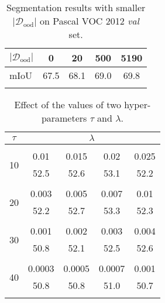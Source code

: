 \documentclass[10pt,twocolumn,letterpaper]{article}
\begin{document}
\newpage
\begin{table}[htbp]
\caption{Segmentation results with smaller $|\mathcal{D}_\text{ood}|$ on Pascal VOC 2012 \textit{val} set.}\label{table_smaller}
\centering
    \begin{tabular}{lcccc}
     \Xhline{1pt}
    { $|\mathcal{D}_\text{ood}|$}  &  0  & 20 & 500 & 5190\\ 
    \hline 
    mIoU & 67.5  &   68.1 & 69.0  & 69.8 \\
    \Xhline{1pt}
    \end{tabular}
\end{table}
\begin{table}[htbp]
  \centering
  \caption{Effect of the values of two hyper-parameters $\tau$ and $\lambda$.}
    \begin{tabular}{ccccc}
    \Xhline{1pt}
    $\tau$   & \multicolumn{4}{c}{$\lambda$} \\
\hline\hline \\[-0.9em]
\multicolumn{1}{c}{\multirow{2}[0]{*}{10}} & 0.01  & 0.015 & 0.02  & 0.025 \\
    \multicolumn{1}{c}{} & 52.5  & 52.6  & 53.1  & 52.2 \\
    \hline \\[-0.9em]
    \multicolumn{1}{c}{\multirow{2}[0]{*}{20}} &  0.003     &  0.005       &   0.007    &  0.01\\
    \multicolumn{1}{c}{} &   52.2    &  52.7   &      53.3 & 52.3 \\
        \hline \\[-0.9em]

    \multicolumn{1}{c}{\multirow{2}[0]{*}{30}} &    0.001   &  0.002     &  0.003     & 0.004 \\
    \multicolumn{1}{c}{} &    50.8   &   52.1    &   52.5    &  52.6\\
        \hline \\[-0.9em]

    \multicolumn{1}{c}{\multirow{2}[0]{*}{40}} &   0.0003    & 0.0005      &     0.0007  & 0.001 \\
    \multicolumn{1}{c}{} &    50.8   &   50.8    &    51.0   & 50.7 \\
    
    \Xhline{1pt}
    \end{tabular}\label{table_tau_lambda}\end{table} 




\renewcommand{\tabcolsep}{2pt}
\end{document}
